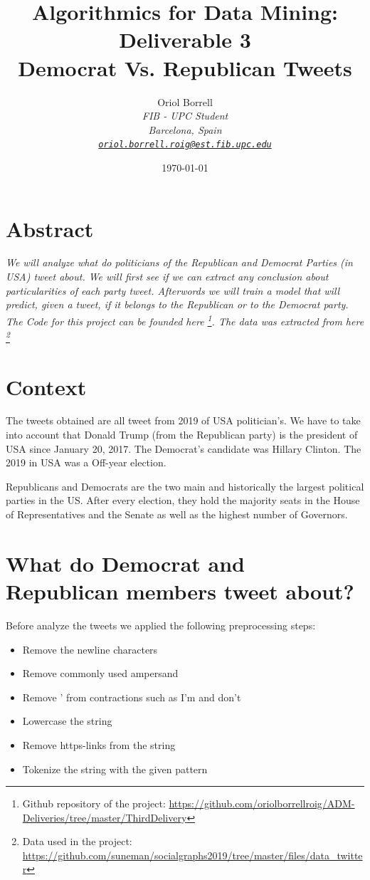 \documentclass{article}
\title{
\textbf{Algorithmics for Data Mining: Deliverable 3\\} \Large{
    Democrat Vs. Republican Tweets}}
\author{Oriol Borrell\\
\textit{\small FIB - UPC Student} \\
\textit{\small Barcelona, Spain} \\
\textit{\texttt{\href{mailto:oriol.borrell.roig@est.fib.upc.edu}
{\small oriol.borrell.roig@est.fib.upc.edu}}}}
\date{\today}
\begin{document}
\maketitle

\section{Abstract}

\textit{
We will analyze what do politicians of the Republican and Democrat Parties (in USA) tweet about. We will first see if we can extract any conclusion about particularities of each party tweet. Afterwords we will train a model that will predict, given a tweet, if it belongs to the Republican or to the Democrat party.
The Code for this project can be founded here \footnote{Github repository of the project: \url{https://github.com/oriolborrellroig/ADM-Deliveries/tree/master/ThirdDelivery}}. The data was extracted from here \footnote{Data used in the project: \url{https://github.com/suneman/socialgraphs2019/tree/master/files/data_twitter}}
}

\section{Context}
\label{Context}
The tweets obtained are all tweet from 2019 of USA politician's. We have to take into account that Donald Trump (from the Republican party) is the president of USA since January 20, 2017. The Democrat's candidate was Hillary Clinton. The 2019 in USA was a Off-year election.

Republicans and Democrats are the two main and historically the largest political parties in the US. After every election, they hold the majority seats in the House of Representatives and the Senate as well as the highest number of Governors.

\section{What do Democrat and Republican members tweet about?}
\label{sec:Wordcloud}

Before analyze the tweets we applied the following preprocessing steps:
\begin{itemize}
    \item Remove the newline characters
    \item Remove commonly used ampersand
    \item Remove ' from contractions such as I'm and don't
    \item Lowercase the string
    \item Remove https-links from the string
    \item Tokenize the string with the given pattern
\end{itemize}
\end{document}
